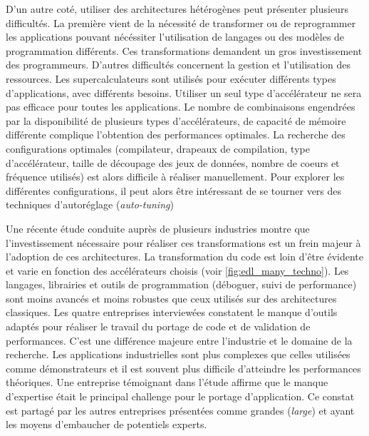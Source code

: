         D'un autre coté, utiliser des architectures hétérogènes peut présenter plusieurs difficultés. La première vient de la nécessité de transformer ou de reprogrammer les applications pouvant nécéssiter l'utilisation de langages  ou des modèles de programmation différents. Ces transformations demandent un gros investissement des programmeurs. D'autres difficultés concernent la gestion et l'utilisation des ressources. Les supercalculateurs sont utilisés pour exécuter différents types d'applications, avec différents besoins. Utiliser un seul type d'accélérateur ne sera pas efficace pour toutes les applications. Le nombre de combinaisons engendrées par la disponibilité de plusieurs types d'accélérateurs, de capacité de mémoire différente complique l'obtention des performances optimales. La recherche des configurations optimales (compilateur, drapeaux de compilation, type d'accélérateur, taille de découpage des jeux de données, nombre de coeurs et fréquence utilisés) est alors difficile à réaliser manuellement. Pour explorer les différentes configurations, il peut alors être intéressant de se tourner vers des techniques d'autoréglage (\textit{auto-tuning}) \cite{datta2008stencil, hoste2008cole, mazouz2011performance, castro2015cere, popov:tel-01412638,  benkner_et_al:DR:2014:4423} 
        
        Une récente étude \cite{inproceedingsSCHC} conduite auprès de plusieurs industries montre que l'investissement nécessaire pour réaliser ces transformations est un frein majeur à l'adoption de ces architectures. La transformation du code est loin d'être évidente et varie en fonction des accélérateurs choisis (voir \autoref{fig:edl_many_techno}). Les langages, librairies et outils de programmation (déboguer, suivi de performance) sont moins avancés et moins robustes que ceux utilisés sur des architectures classiques. Les quatre entreprises interviewées \cite{inproceedingsSCHC} constatent le manque d'outils adaptés pour réaliser le travail du portage de code et de validation de performances. C'est une différence majeure entre l'industrie et le domaine de la recherche. Les applications industrielles sont plus complexes que celles utilisées comme démonstrateurs et il est souvent plus difficile d'atteindre les performances théoriques. Une entreprise témoignant dans l'étude \cite{inproceedingsSCHC} affirme que le manque d'expertise était le principal challenge pour le portage d'application. Ce constat est partagé par les autres entreprises présentées comme grandes (\textit{large}) et ayant les moyens d'embaucher de potentiels experts.
        
